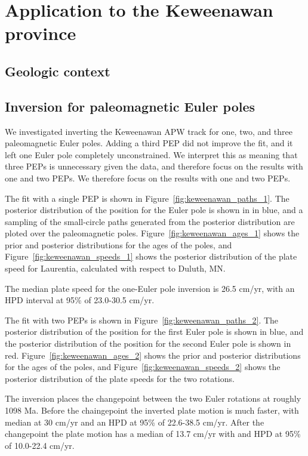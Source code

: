 \documentclass[preprint,12pt,authoryear]{elsarticle}
\begin{document}
\section{Application to the Keweenawan province}
\label{sec:keweenawan}
\subsection{Geologic context}
\citet{swanson2009no}
\subsection{Inversion for paleomagnetic Euler poles}
\clearpage

\begin{landscape}

\end{landscape}

We investigated inverting the Keweenawan APW track for one, two, and three paleomagnetic Euler poles.
Adding a third PEP did not improve the fit, and it left one Euler pole completely unconstrained.
We interpret this as meaning that three PEPs is unnecessary given the data, and therefore focus
on the results with one and two PEPs.
We therefore focus on the results with one and two PEPs.

The fit with a single PEP is shown in Figure~\ref{fig:keweenawan_paths_1}.
The posterior distribution of the position for the Euler pole is shown in in blue,
and a sampling of the small-circle paths generated from the posterior distribution are ploted over the paleomagnetic poles.
Figure~\ref{fig:keweenawan_ages_1} shows the prior and posterior distributions for the ages of the poles,
and Figure~\ref{fig:keweenawan_speeds_1} shows the posterior distribution of the plate speed for Laurentia,
calculated with respect to Duluth, MN.

The median plate speed for the one-Euler pole inversion is 26.5 cm/yr, with an HPD interval at 95\% of 23.0-30.5 cm/yr.

The fit with two PEPs is shown in Figure~\ref{fig:keweenawan_paths_2}.
The posterior distribution of the position for the first Euler pole is shown in blue,
and the posterior distribution of the position for the second Euler pole is shown in red.
Figure~\ref{fig:keweenawan_ages_2} shows the prior and posterior distributions for the ages of the poles,
and Figure~\ref{fig:keweenawan_speeds_2} shows the posterior distribution of the plate speeds for the two rotations.

The inversion places the changepoint between the two Euler rotations at roughly 1098 Ma.
Before the chaingepoint the inverted plate motion is much faster, with median at 30 cm/yr
and an HPD at 95\% of 22.6-38.5 cm/yr. After the changepoint the plate motion has a median
of 13.7 cm/yr with and HPD at 95\% of 10.0-22.4 cm/yr.
\end{document}
